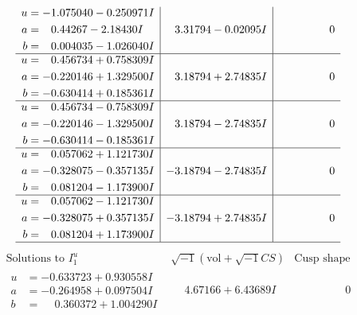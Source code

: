 \documentclass[1p]{elsarticle_modified}
\theoremstyle{definition}
\newcommand{\I}{\sqrt{-1}}
\begin{document}
$$\begin{array}{c|c|c}
\begin{aligned}
u &= -1.075040 - 0.250971 I \\
a &= \phantom{-}0.44267 - 2.18430 I \\
b &= \phantom{-}0.004035 - 1.026040 I\end{aligned}
 & \phantom{-}3.31794 - 0.02095 I & \phantom{-0.000000 } 0 \\ \hline\begin{aligned}
u &= \phantom{-}0.456734 + 0.758309 I \\
a &= -0.220146 + 1.329500 I \\
b &= -0.630414 + 0.185361 I\end{aligned}
 & \phantom{-}3.18794 + 2.74835 I & \phantom{-0.000000 } 0 \\ \hline\begin{aligned}
u &= \phantom{-}0.456734 - 0.758309 I \\
a &= -0.220146 - 1.329500 I \\
b &= -0.630414 - 0.185361 I\end{aligned}
 & \phantom{-}3.18794 - 2.74835 I & \phantom{-0.000000 } 0 \\ \hline\begin{aligned}
u &= \phantom{-}0.057062 + 1.121730 I \\
a &= -0.328075 - 0.357135 I \\
b &= \phantom{-}0.081204 - 1.173900 I\end{aligned}
 & -3.18794 - 2.74835 I & \phantom{-0.000000 } 0 \\ \hline\begin{aligned}
u &= \phantom{-}0.057062 - 1.121730 I \\
a &= -0.328075 + 0.357135 I \\
b &= \phantom{-}0.081204 + 1.173900 I\end{aligned}
 & -3.18794 + 2.74835 I & \phantom{-0.000000 } 0\\
 \hline 
 \end{array}$$\newpage$$\begin{array}{c|c|c}  
\text{Solutions to }I^u_{1}& \I (\text{vol} + \sqrt{-1}CS) & \text{Cusp shape}\\
 \hline 
\begin{aligned}
u &= -0.633723 + 0.930558 I \\
a &= -0.264958 + 0.097504 I \\
b &= \phantom{-}0.360372 + 1.004290 I\end{aligned}
 & \phantom{-}4.67166 + 6.43689 I & \phantom{-0.000000 } 0 \\ \hline\begin{aligned}

\end{aligned}
\end{array}$$
\end{document}
